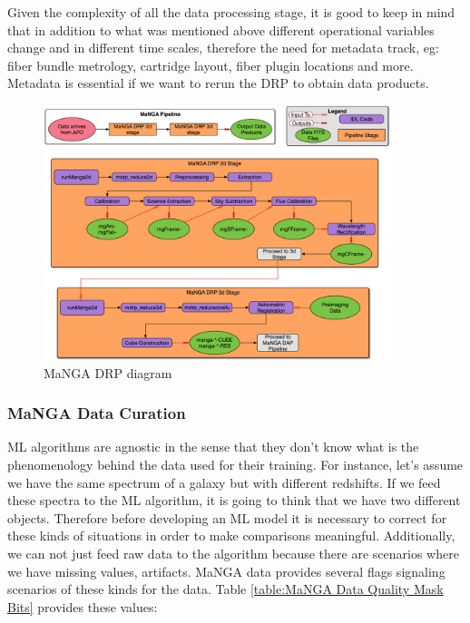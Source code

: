 Given the complexity of all the data processing stage, it is good to keep in mind that in addition to what was mentioned above different operational variables change and in different time scales, therefore the need for metadata track, eg: fiber bundle metrology, cartridge layout, fiber plugin locations and more. Metadata is essential if we want to rerun the DRP to obtain data products.

\begin{figure}[h!]
  \centering
    \includegraphics[width=0.9\textwidth]{MaNGA_DRP_diagram.jpg}
  \caption{\small{MaNGA DRP diagram \citep{law2016}}}
  \label{fig: outlier_URF}
\end{figure}

\subsubsection*{MaNGA Data Curation}

ML algorithms are agnostic in the sense that they don't know what is the phenomenology behind the data used for their training. For instance, let's assume we have the same spectrum of a galaxy but with different redshifts. If we feed these spectra to the ML algorithm, it is going to think that we have two different objects. Therefore before developing an ML model it is necessary to correct for these kinds of situations in order to make comparisons meaningful. Additionally, we can not just feed raw data to the algorithm because there are scenarios where we have missing values, artifacts. MaNGA data provides several flags signaling scenarios of these kinds for the data. Table \ref{table:MaNGA Data Quality Mask Bits} provides these values:

